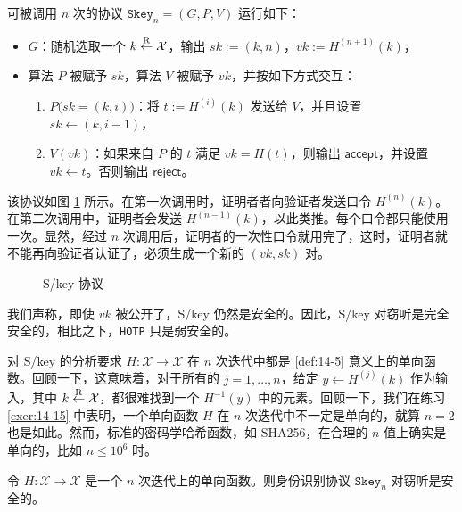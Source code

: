 \begin{snote}[S/key 协议。]
可被调用 $n$ 次的协议 $\mathtt{Skey}_n=(G,P,V)$ 运行如下：
\begin{itemize}
	\item $G$：随机选取一个 $k\overset{\rm R}\leftarrow\mathcal{X}$，输出 $sk:=(k,n)$，$vk:=H^{(n+1)}(k)$，
	\item 算法 $P$ 被赋予 $sk$，算法 $V$ 被赋予 $vk$，并按如下方式交互：
	\begin{enumerate}
		\item $P\big(sk=(k,i)\big)$：将 $t:=H^{(i)}(k)$ 发送给 $V$，并且设置 $sk\leftarrow(k,i-1)$，
		\item $V(vk)$：如果来自 $P$ 的 $t$ 满足 $vk=H(t)$，则输出 $\mathsf{accept}$，并设置 $vk\leftarrow t$。否则输出 $\mathsf{reject}$。
	\end{enumerate}
\end{itemize}
该协议如图 \ref{fig:18-9} 所示。在第一次调用时，证明者者向验证者发送口令 $H^{(n)}(k)$。在第二次调用中，证明者会发送 $H^{(n-1)}(k)$，以此类推。每个口令都只能使用一次。显然，经过 $n$ 次调用后，证明者的一次性口令就用完了，这时，证明者就不能再向验证者认证了，必须生成一个新的 $(vk,sk)$ 对。
\end{snote}

\begin{figure}
  \centering
  
  \caption{S/key 协议}
  \label{fig:18-9}
\end{figure}

\begin{snote}
我们声称，即使 $vk$ 被公开了，S/key 仍然是安全的。因此，S/key 对窃听是完全安全的，相比之下，\texttt{HOTP} 只是弱安全的。

对 S/key 的分析要求 $H:\mathcal{X}\to\mathcal{X}$ 在 $n$ 次迭代中都是 \ref{def:14-5} 意义上的单向函数。回顾一下，这意味着，对于所有的 $j=1,\dots,n$，给定 $y\leftarrow H^{(j)}(k)$ 作为输入，其中 $k\overset{\rm R}\leftarrow\mathcal{X}$，都很难找到一个 $H^{-1}(y)$ 中的元素。回顾一下，我们在练习 \ref{exer:14-15} 中表明，一个单向函数 $H$ 在 $n$ 次迭代中不一定是单向的，就算 $n=2$ 也是如此。然而，标准的密码学哈希函数，如 SHA256，在合理的 $n$ 值上确实是单向的，比如 $n\leq 10^{6}$ 时。
\end{snote}

\begin{theorem}\label{theo:18-5}
令 $H:\mathcal{X}\to\mathcal{X}$ 是一个 $n$ 次迭代上的单向函数。则身份识别协议 $\mathtt{Skey}_n$ 对窃听是安全的。
\end{theorem}


